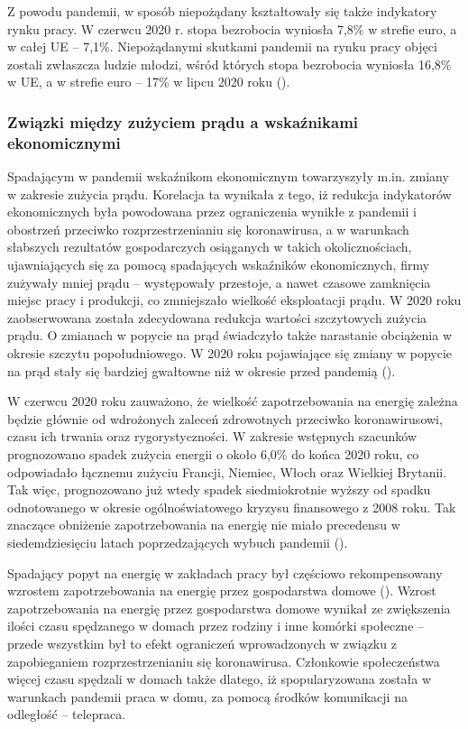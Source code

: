 \documentclass[polish, twoside, 12pt, a4paper]{article}
\theoremstyle{definition}
\theoremstyle{plain}
\theoremstyle{remark}
\begin{document}
Z powodu pandemii, w sposób niepożądany kształtowały się także indykatory rynku pracy. W czerwcu 2020 r. stopa bezrobocia wyniosła 7,8\% w strefie euro, a w całej UE – 7,1\%. Niepożądanymi skutkami pandemii na rynku pracy objęci zostali zwłaszcza ludzie młodzi, wśród których stopa bezrobocia wyniosła 16,8\% w UE, a w strefie euro – 17\% w lipcu 2020 roku (\cite{dziembala2021}).

\subsubsection{Związki między zużyciem prądu a wskaźnikami ekonomicznymi}

Spadającym w pandemii wskaźnikom ekonomicznym towarzyszyły m.in. zmiany w zakresie zużycia prądu. Korelacja ta wynikała z tego, iż redukcja indykatorów ekonomicznych była powodowana przez ograniczenia wynikłe z pandemii i obostrzeń przeciwko rozprzestrzenianiu się koronawirusa, a w warunkach słabszych rezultatów gospodarczych osiąganych w takich okolicznościach, ujawniających się za pomocą spadających wskaźników ekonomicznych, firmy zużywały mniej prądu – występowały przestoje, a nawet czasowe zamknięcia miejsc pracy i produkcji, co zmniejszało wielkość eksploatacji prądu. W 2020 roku zaobserwowana została zdecydowana redukcja wartości szczytowych zużycia prądu. O zmianach w popycie na prąd świadczyło także narastanie obciążenia w okresie szczytu popołudniowego. W 2020 roku pojawiające się zmiany w popycie na prąd stały się bardziej gwałtowne niż w okresie przed pandemią (\cite{stahl2021}). 

W czerwcu 2020 roku zauważono, że wielkość zapotrzebowania na energię zależna będzie głównie od wdrożonych zaleceń zdrowotnych przeciwko koronawirusowi, czasu ich trwania oraz rygorystyczności. W zakresie wstępnych szacunków prognozowano spadek zużycia energii o około 6,0\% do końca 2020 roku, co odpowiadało łącznemu zużyciu Francji, Niemiec, Włoch oraz Wielkiej Brytanii. Tak więc, prognozowano już wtedy spadek siedmiokrotnie wyższy od spadku odnotowanego w okresie ogólnoświatowego kryzysu finansowego z 2008 roku. Tak znaczące obniżenie zapotrzebowania na energię nie miało precedensu w siedemdziesięciu latach poprzedzających wybuch pandemii (\cite{kolenda2020}). 

Spadający popyt na energię w zakładach pracy był częściowo rekompensowany wzrostem zapotrzebowania na energię przez gospodarstwa domowe (\cite{cire2023}). Wzrost zapotrzebowania na energię przez gospodarstwa domowe wynikał ze zwiększenia ilości czasu spędzanego w domach przez rodziny i inne komórki społeczne – przede wszystkim był to efekt ograniczeń wprowadzonych w związku z zapobieganiem rozprzestrzenianiu się koronawirusa. Członkowie społeczeństwa więcej czasu spędzali w domach także dlatego, iż spopularyzowana została w warunkach pandemii praca w domu, za pomocą środków komunikacji na odległość – telepraca. 
\end{document}
